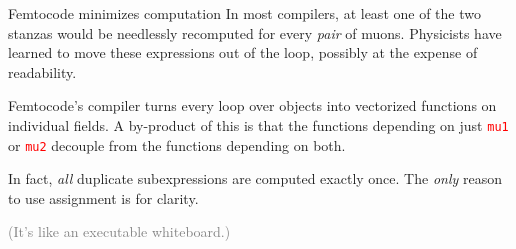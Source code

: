 \documentclass{beamer}
\begin{document}
\begin{frame}{Femtocode minimizes computation}
In most compilers, at least one of the two stanzas would be needlessly recomputed for every {\it pair} of muons. Physicists have learned to move these expressions out of the loop, possibly at the expense of readability.

\vfill
Femtocode's compiler turns every loop over objects into vectorized functions on individual fields. A by-product of this is that the functions depending on just \textcolor{red}{\tt mu1} or \textcolor{red}{\tt mu2} decouple from the functions depending on both.

\vfill
In fact, {\it all} duplicate subexpressions are computed exactly once. The {\it only} reason to use assignment is for clarity.

\vfill
\textcolor{gray}{(It's like an executable whiteboard.)}
\end{frame}
\end{document}
